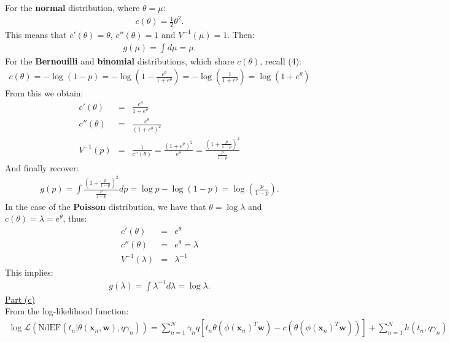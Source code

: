 \documentclass[a4paper, 11pt]{article}
\begin{document}
For the \textbf{normal} distribution, where $\theta = \mu$:
\begin{eqnarray}
c(\theta) = \frac{1}{2} \theta^2. \nonumber
\end{eqnarray}
This means that $c'(\theta) = \theta$, $c''(\theta) = 1$ and $V^{-1}(\mu) = 1$. Then:
\begin{eqnarray}
g(\mu) = \int d\mu = \mu. \nonumber
\end{eqnarray}
For the \textbf{Bernouilli} and \textbf{binomial} distributions, which share $c(\theta)$, recall (4):
\begin{eqnarray}
c(\theta) = -\log{(1-p)} = -\log{\left( 1 - \frac{e^\theta}{1+e^\theta} \right)} = -\log{\left( \frac{1}{1+e^\theta} \right)} = \log{(1 + e^\theta)} \nonumber
\end{eqnarray}
From this we obtain:
\begin{eqnarray}
c'(\theta) &=& \frac{e^\theta}{1 + e^\theta} \nonumber \\
c''(\theta) &=& \frac{e^\theta}{(1 + e^\theta)^2}\nonumber \\
V^{-1}(p) &=& \frac{1}{c''(\theta)} = \frac{(1 + e^\theta)^2}{e^\theta} = \frac{\left(1 + \frac{p}{1-p}\right)^2}{\frac{p}{1-p}} \nonumber
\end{eqnarray}
And finally recover:
\begin{eqnarray}
g(p) = \int \frac{(1 + \frac{p}{1-p})^2}{\frac{p}{1-p}} dp = \log p - \log{(1-p)} = \log{\left(\frac{p}{1-p}\right)}. \nonumber
\end{eqnarray}
In the case of the \textbf{Poisson} distribution, we have that $\theta = \log \lambda$ and $c(\theta) = \lambda = e^{\theta}$, thus:
\begin{eqnarray}
c'(\theta) &=& e^{\theta} \nonumber \\
c''(\theta) &=& e^{\theta}  = \lambda \nonumber \\
V^{-1}(\lambda) &=& \lambda^{-1} \nonumber
\end{eqnarray}
This implies:
\begin{eqnarray}
g(\lambda) = \int \lambda^{-1} d\lambda = \log \lambda. \nonumber
\end{eqnarray}
\newline \underline{Part (c)}\\
\newline From the log-likelihood function:
\begin{eqnarray}
\log \mathcal{L} \left( \text{NdEF}( t_n | \theta (\mathbf{x}_n, \mathbf{w}), q \gamma_n ) \right) = \sum_{n=1}^{N} \gamma_n q [ t_n \theta( \phi(\mathbf{x}_n)^T \mathbf{w}) - c(\theta(\phi(\mathbf{x}_n)^T \mathbf{w})) ] + \sum_{n=1}^{N} h(t_n, q \gamma_n) \nonumber
\end{eqnarray}
\end{document}
